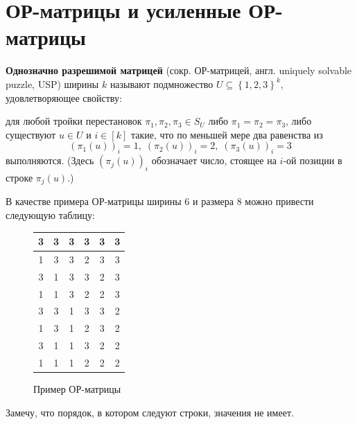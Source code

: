 \section{ОР-матрицы и усиленные ОР-матрицы}

\begin{definition}
  \textbf{Однозначно разрешимой матрицей} (сокр. ОР-матрицей, англ. uniquely solvable puzzle, USP) ширины $k$ называют подмножество $U \subseteq \left\{ 1,2,3 \right\}^k$, удовлетворяющее свойству: 
  
  для любой тройки перестановок $\pi_1, \pi_2, \pi_3 \in S_U$ либо $\pi_1=\pi_2=\pi_3$, либо существуют $u \in U$ и $i \in [k]$ такие, что по меньшей мере два равенства из 
  \[\left( \pi_1(u) \right)_i = 1,\; \left( \pi_2(u) \right)_i = 2,\; \left( \pi_3(u) \right)_i = 3\]
  выполняются. (Здесь $\left( \pi_j(u) \right)_i$ обозначает число, стоящее на $i$-ой позиции в строке $\pi_j(u)$.)
\end{definition}

В качестве примера ОР-матрицы ширины 6 и размера 8 можно привести следующую таблицу:
\begin{figure}[H]
	\begin{center}
	   \begin{tabular}{|c|c|c|c|c|c|}
	    \hline 
	    3 & 3 & 3 & 3 & 3 & 3\\ \hline
	    1 & 3 & 3 & 2 & 3 & 3\\ \hline
	    3 & 1 & 3 & 3 & 2 & 3\\ \hline
	    1 & 1 & 3 & 2 & 2 & 3\\ \hline
	    3 & 3 & 1 & 3 & 3 & 2\\ \hline
	    1 & 3 & 1 & 2 & 3 & 2\\ \hline
	    3 & 1 & 1 & 3 & 2 & 2\\ \hline
	    1 & 1 & 1 & 2 & 2 & 2\\ 
	    \hline
	  \end{tabular}
	\end{center}
	\caption{Пример ОР-матрицы}
	\label{usp}
\end{figure}
Замечу, что порядок, в котором следуют строки, значения не имеет. 

